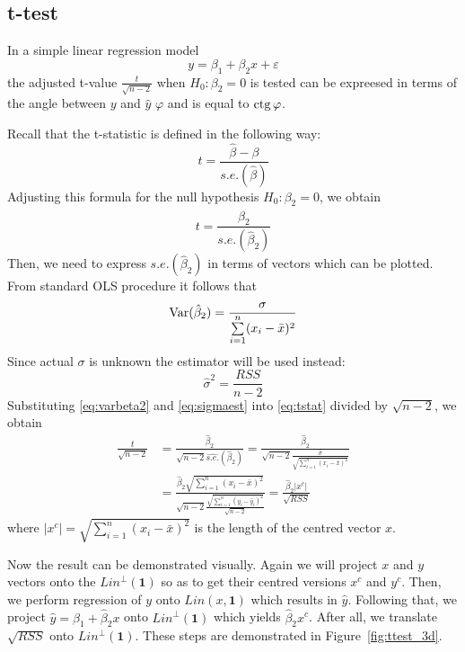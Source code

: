 \subsection{t-test}

In a simple linear regression model
\[
y = \beta_1 + \beta_2 x + \varepsilon
\]
the adjusted t-value $\frac{t}{\sqrt{n-2}}$ when $H_0: \beta_2 = 0$ is tested
can be expreesed in terms of the angle between $y$ and $\hat y$ $\varphi$ and
is equal to $\operatorname{ctg} \varphi$.

Recall that the t-statistic is defined in the following way:
\[
t = \frac{\hat \beta - \beta}{s.e.(\hat\beta)}
\]
Adjusting this formula for the null hypothesis $H_0: \beta_2 = 0$, we obtain
\begin{equation}\label{eq:tstat}
t = \frac{\hat \beta_2}{s.e.(\hat\beta_2)}
\end{equation}
Then, we need to express $s.e.(\hat\beta_2)$ in terms of vectors which can be
plotted. From standard OLS procedure it follows that
\begin{equation}\label{eq:varbeta2}
\operatorname{Var}(\hat \beta_2) = \frac{\sigma}{\sum\limits_{i=1}^n (x_i - \bar x)^2}
\end{equation}
Since actual $\sigma$ is unknown the estimator will be used instead:
\begin{equation}\label{eq:sigmaest}
\hat \sigma^2 = \frac{RSS}{n-2}
\end{equation}
Substituting \eqref{eq:varbeta2} and \eqref{eq:sigmaest} into \eqref{eq:tstat}
divided by $\sqrt{n-2}$, we obtain
\begin{align*}
\frac{t}{\sqrt{n-2}} &= \frac{\hat \beta_2}{\sqrt{n-2}\widehat{s.e.}(\hat\beta_2)} = \frac{\hat \beta_2}{\sqrt{n-2}\frac{\hat \sigma}{\sqrt{\sum\limits_{i=1}^n (x_i - \bar x)^2}}} \\
&= \frac{\hat \beta_2 \sqrt{\sum\limits_{i=1}^n (x_i - \bar x)^2}}{\sqrt{n-2}\frac{\sqrt{\sum\limits_{i=1}^n (y_i - \hat y_i)^2}}{\sqrt{n-2}}} = \frac{\hat \beta_2 \vert x^c \vert}{\sqrt{RSS}}
\end{align*}
where $ \vert x^c \vert = \sqrt{\sum_{i=1}^n (x_i - \bar x)^2}$ is the length of the
centred vector $x$.

Now the result can be demonstrated visually.
Again we will project $x$ and $y$ vectors onto the $Lin^{\perp}(\mathbf{1})$ so as to
get their centred versions $x^c$ and $y^c$.
Then, we perform regression of $y$ onto $Lin(x, \mathbf{1})$ which results in $\hat y$.
Following that, we project $\hat y = \hat \beta_1 + \hat \beta_2 x$ onto $Lin^{\perp}(\mathbf{1})$
which yields $\hat \beta_2 x^c$.
After all, we translate $\sqrt{RSS}$ onto $Lin^{\perp}(\mathbf{1})$.
These steps are demonstrated in Figure~\ref{fig:ttest_3d}.

